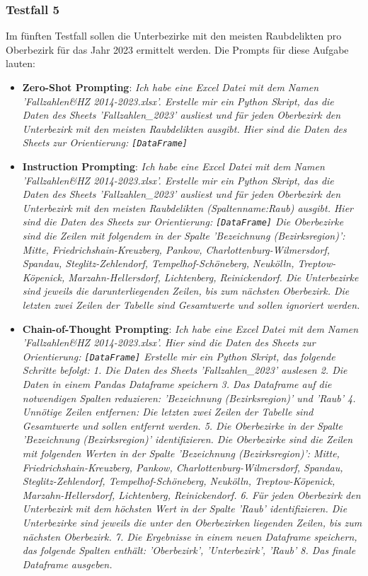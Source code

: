 \documentclass[11pt,a4paper]{article}
\begin{document}
\subsubsection{Testfall 5}
    Im fünften Testfall sollen die Unterbezirke mit den meisten Raubdelikten pro Oberbezirk für das Jahr 2023 ermittelt werden. Die Prompts für diese Aufgabe lauten:
    \begin{itemize}
        \item \textbf{Zero-Shot Prompting}: \emph{Ich habe eine Excel Datei mit dem Namen 'Fallzahlen\&HZ 2014-2023.xlsx'. Erstelle mir ein Python Skript, das die Daten des Sheets 'Fallzahlen\_2023' ausliest und für jeden Oberbezirk den Unterbezirk mit den meisten Raubdelikten ausgibt.
        Hier sind die Daten des Sheets zur Orientierung: \texttt{[DataFrame]}}
        \item \textbf{Instruction Prompting}: \emph{Ich habe eine Excel Datei mit dem Namen 'Fallzahlen\&HZ 2014-2023.xlsx'. Erstelle mir ein Python Skript, das die Daten des Sheets 'Fallzahlen\_2023' ausliest und für jeden Oberbezirk den Unterbezirk mit den meisten Raubdelikten (Spaltenname:Raub) ausgibt.
        Hier sind die Daten des Sheets zur Orientierung: \texttt{[DataFrame]}
        Die Oberbezirke sind die Zeilen mit folgendem in der Spalte 'Bezeichnung (Bezirksregion)': Mitte, Friedrichshain-Kreuzberg, Pankow, Charlottenburg-Wilmersdorf, Spandau, Steglitz-Zehlendorf, Tempelhof-Schöneberg, Neukölln, Treptow-Köpenick, Marzahn-Hellersdorf, Lichtenberg, Reinickendorf. Die Unterbezirke sind jeweils die darunterliegenden Zeilen, bis zum nächsten Oberbezirk. Die letzten zwei Zeilen der Tabelle sind Gesamtwerte und sollen ignoriert werden.}
        \item \textbf{Chain-of-Thought Prompting}: \emph{Ich habe eine Excel Datei mit dem Namen 'Fallzahlen\&HZ 2014-2023.xlsx'. Hier sind die Daten des Sheets zur Orientierung: \texttt{[DataFrame]}
        Erstelle mir ein Python Skript, das folgende Schritte befolgt:
        1. Die Daten des Sheets 'Fallzahlen\_2023' auslesen
        2. Die Daten in einem Pandas Dataframe speichern
        3. Das Dataframe auf die notwendigen Spalten reduzieren: 'Bezeichnung (Bezirksregion)' und 'Raub'
        4. Unnötige Zeilen entfernen: Die letzten zwei Zeilen der Tabelle sind Gesamtwerte und sollen entfernt werden.
        5. Die Oberbezirke in der Spalte 'Bezeichnung (Bezirksregion)' identifizieren. Die Oberbezirke sind die Zeilen mit folgenden Werten in der Spalte 'Bezeichnung (Bezirksregion)': Mitte, Friedrichshain-Kreuzberg, Pankow, Charlottenburg-Wilmersdorf, Spandau, Steglitz-Zehlendorf, Tempelhof-Schöneberg, Neukölln, Treptow-Köpenick, Marzahn-Hellersdorf, Lichtenberg, Reinickendorf.
        6. Für jeden Oberbezirk den Unterbezirk mit dem höchsten Wert in der Spalte 'Raub' identifizieren. Die Unterbezirke sind jeweils die unter den Oberbezirken liegenden Zeilen, bis zum nächsten Oberbezirk.
        7. Die Ergebnisse in einem neuen Dataframe speichern, das folgende Spalten enthält: 'Oberbezirk', 'Unterbezirk', 'Raub'
        8. Das finale Dataframe ausgeben.}
    \end{itemize}
\end{document}
